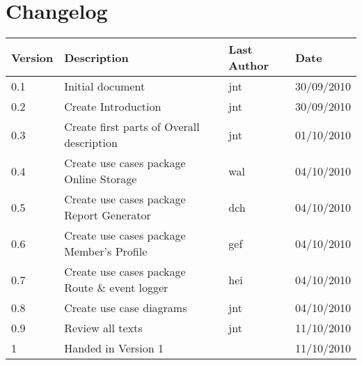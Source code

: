 \section*{Changelog}

\begin{table}[h!]
	\begin{center}
		\begin{tabular}{|l|l|l|l|}
			\hline
			\rowcolor{fontys_pink_light}Version	&Description	&Last Author	&Date\\
			\hline
			0.1	&Initial document	&jnt	&30/09/2010\\
			\hline
			0.2	&Create Introduction	&jnt	&30/09/2010\\
			\hline
			0.3	&Create first parts of Overall description	&jnt	&01/10/2010\\
			\hline
			0.4	&Create use cases package Online Storage&wal	&04/10/2010\\
			\hline
			0.5	&Create use cases package Report Generator	&dch	&04/10/2010\\
			\hline
			0.6	&Create use cases package Member's Profile	&gef	&04/10/2010\\
			\hline
			0.7	&Create use cases package Route \& event logger	&hei	&04/10/2010\\
			\hline
			0.8	&Create use case diagrams	&jnt	&04/10/2010\\
			\hline
			0.9	&Review all texts	&jnt	&11/10/2010\\
			\hline
			\rowcolor{fontysgreen2}1	& Handed in Version 1 & &11/10/2010\\

		\hline
		\end{tabular}
	\end{center}
	\label{tab:changelog}
\end{table}

